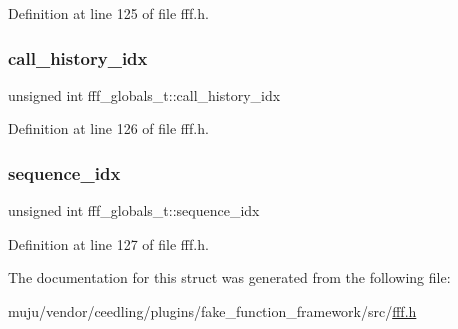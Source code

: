 Definition at line 125 of file fff.\+h.

\mbox{\label{structfff__globals__t_ad5c29f2faa27bef5e706417cd2a73eb5}} 
\subsubsection{\texorpdfstring{call\+\_\+history\+\_\+idx}{call\_history\_idx}}
{\footnotesize\ttfamily unsigned int fff\+\_\+globals\+\_\+t\+::call\+\_\+history\+\_\+idx}



Definition at line 126 of file fff.\+h.

\mbox{\label{structfff__globals__t_a01b8f5a605a1eccdbab61e5d40cd4c57}} 
\subsubsection{\texorpdfstring{sequence\+\_\+idx}{sequence\_idx}}
{\footnotesize\ttfamily unsigned int fff\+\_\+globals\+\_\+t\+::sequence\+\_\+idx}



Definition at line 127 of file fff.\+h.



The documentation for this struct was generated from the following file\+:\begin{DoxyCompactItemize}
\item 
muju/vendor/ceedling/plugins/fake\+\_\+function\+\_\+framework/src/\hyperlink{fff_8h}{fff.\+h}\end{DoxyCompactItemize}
